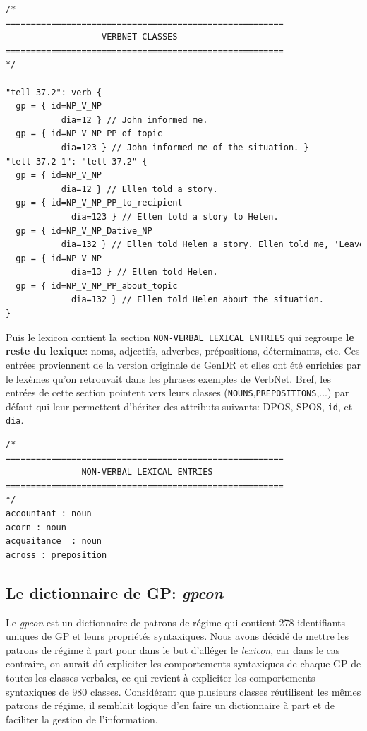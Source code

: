 \begin{lstlisting}[language=XML, caption = Partie: Classes de VerbNet]
/*
=======================================================
                   VERBNET CLASSES
=======================================================
*/

"tell-37.2": verb {
  gp = { id=NP_V_NP  
	       dia=12 } // John informed me.
  gp = { id=NP_V_NP_PP_of_topic  
	       dia=123 } // John informed me of the situation. }
"tell-37.2-1": "tell-37.2" {
  gp = { id=NP_V_NP  
	       dia=12 } // Ellen told a story.
  gp = { id=NP_V_NP_PP_to_recipient 
		     dia=123 } // Ellen told a story to Helen.
  gp = { id=NP_V_NP_Dative_NP   
	       dia=132 } // Ellen told Helen a story. Ellen told me, 'Leave the room.'
  gp = { id=NP_V_NP
		     dia=13 } // Ellen told Helen.
  gp = { id=NP_V_NP_PP_about_topic
		     dia=132 } // Ellen told Helen about the situation.
}
\end{lstlisting}

Puis le lexicon contient la section \texttt{NON-VERBAL LEXICAL ENTRIES} qui regroupe \textbf{le reste du lexique}: noms, adjectifs, adverbes, prépositions, déterminants, etc. Ces entrées proviennent de la version originale de GenDR \citep{lareau18} et elles ont été enrichies par le lexèmes qu'on retrouvait dans les phrases exemples de VerbNet. Bref, les entrées de cette section pointent vers leurs classes (\texttt{NOUNS},\texttt{PREPOSITIONS},...) par défaut qui leur permettent d'hériter des attributs suivants: \ac{DPOS}, \ac{SPOS}, \texttt{id}, et \texttt{dia}.

\begin{lstlisting}[language=XML, caption = Partie: Unités lexicales non-verbales]
/*
=======================================================
               NON-VERBAL LEXICAL ENTRIES     
=======================================================
*/
accountant : noun
acorn : noun
acquaitance  : noun
across : preposition
\end{lstlisting}

\subsection{Le dictionnaire de \ac{GP}: \emph{gpcon}}
Le \emph{gpcon} est un dictionnaire de patrons de régime qui contient 278 identifiants uniques de \ac{GP} et leurs propriétés syntaxiques. Nous avons décidé de mettre les patrons de régime à part pour dans le but d'alléger le \emph{lexicon}, car dans le cas contraire, on aurait dû expliciter les comportements syntaxiques de chaque \ac{GP} de toutes les classes verbales, ce qui revient à expliciter les comportements syntaxiques de 980 classes. Considérant que plusieurs classes réutilisent les mêmes patrons de régime, il semblait logique d'en faire un dictionnaire à part et de faciliter la gestion de l'information.

